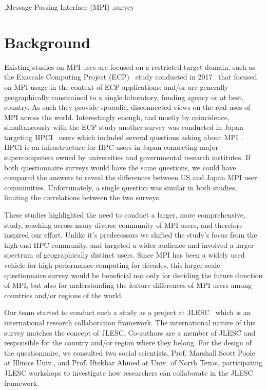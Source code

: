 \documentclass[preprint,5p,times]{elsarticle}
\begin{document}
\begin{keyword}
   \sep Message Passing Interface (MPI) \sep survey
\end{keyword}

\maketitle

\section{Background}

Existing studies on MPI uses are focused on a restricted target
domain, such as the Exascale Computing Project (ECP)~\cite{ECP} study
conducted in 2017~\cite{ECP-survey} that focused
on MPI usage in the
context of ECP applications; and/or are generally geographically
constrained to a single laboratory, funding agency or at best,
country. As such they provide sporadic, disconnected views on the real
uses of MPI across the world.
%
Interestingly enough, and mostly by coincidence, simultaneously with
the ECP study another survey was conducted in Japan targeting
HPCI~\cite{HPCI} users which included several questions asking about
MPI~\cite{hpci-user-survey}.  HPCI is an infrastructure for HPC users
in Japan connecting major supercomputers owned by universities and
governmental research institutes. If both questionnaire surveys would
have the same questions, we could have compared the answers to reveal
the differences between US and Japan MPI user
communities. Unfortunately, a single question was similar in both
studies, limiting the correlations between the two surveys.

These studies highlighted the need to conduct a larger, more comprehensive,
study, reaching across many diverse community of MPI users, and therefore
inspired our effort. Unlike it's predecessors we shifted the study's focus from
the high-end HPC community, and targeted a wider audience and involved a larger
spectrum of geographically distinct users. Since MPI has been a widely used
vehicle for high-performance computing for decades, this larger-scale
questionnaire survey would be beneficial not only for deciding the future
direction of MPI, but also for understanding the feature differences of MPI
users among countries and/or regions of the world.

Our team started to conduct such a study as a project at
JLESC~\cite{JLESC} which is an international research collaboration
framework. The international nature of this survey matches the concept
of JLESC. Co-authors are a member of JLESC and responsible for the
country and/or region where they belong. For the design of the questionnaire,
we consulted two social scientists, Prof. Marshall Scott Poole at
Illinois Univ., and Prof. Iftekhar Ahmed at Univ. of North Texas,
participating JLESC workshops to investigate how researchers can
collaborate in the JLESC framework.
\end{document}
